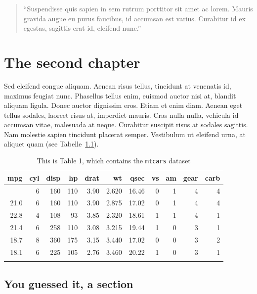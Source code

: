\documentclass[
  12pt,
  a4paperpaper,
  a4paper]{scrreprt}
\begin{document}
\begin{quote}
``Suspendisse quis sapien in sem rutrum porttitor sit amet ac lorem.
Mauris gravida augue eu purus faucibus, id accumsan est varius.
Curabitur id ex egestas, sagittis erat id, eleifend nunc.''
\end{quote}


\chapter{The second chapter}\label{the-second-chapter}

Sed eleifend congue aliquam. Aenean risus tellus, tincidunt at venenatis
id, maximus feugiat nunc. Phasellus tellus enim, euismod auctor nisi at,
blandit aliquam ligula. Donec auctor dignissim eros. Etiam et enim diam.
Aenean eget tellus sodales, laoreet risus at, imperdiet mauris. Cras
nulla nulla, vehicula id accumsan vitae, malesuada at neque. Curabitur
suscipit risus at sodales sagittis. Nam molestie sapien tincidunt
placerat semper. Vestibulum ut eleifend urna, at aliquet quam (see
Tabelle~\ref{tbl-1}).

\begin{longtable}{rrrrrrrrrrr}

\toprule
mpg & cyl & disp & hp & drat & wt & qsec & vs & am & gear & carb \\ 
\midrule\addlinespace[2.5pt]
21.0 & 6 & 160 & 110 & 3.90 & 2.620 & 16.46 & 0 & 1 & 4 & 4 \\ 
21.0 & 6 & 160 & 110 & 3.90 & 2.875 & 17.02 & 0 & 1 & 4 & 4 \\ 
22.8 & 4 & 108 & 93 & 3.85 & 2.320 & 18.61 & 1 & 1 & 4 & 1 \\ 
21.4 & 6 & 258 & 110 & 3.08 & 3.215 & 19.44 & 1 & 0 & 3 & 1 \\ 
18.7 & 8 & 360 & 175 & 3.15 & 3.440 & 17.02 & 0 & 0 & 3 & 2 \\ 
18.1 & 6 & 225 & 105 & 2.76 & 3.460 & 20.22 & 1 & 0 & 3 & 1 \\ 
\bottomrule


\caption{\label{tbl-1}This is Table 1, which contains the
\texttt{mtcars} dataset}

\tabularnewline
\end{longtable}

\section{You guessed it, a section}\label{you-guessed-it-a-section}
\end{document}
